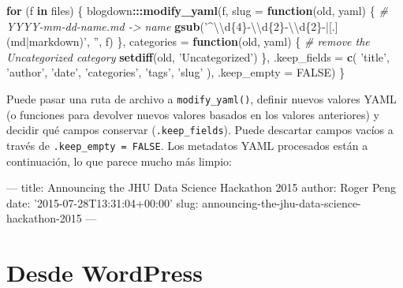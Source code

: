 \documentclass[12pt,]{krantz}
\makeatletter
\newenvironment{Shaded}{\begin{snugshade}}{\end{snugshade}}
\newcommand{\AttributeTok}[1]{\textcolor[rgb]{0.77,0.63,0.00}{#1}}
\newcommand{\CharTok}[1]{\textcolor[rgb]{0.31,0.60,0.02}{#1}}
\newcommand{\CommentTok}[1]{\textcolor[rgb]{0.56,0.35,0.01}{\textit{#1}}}
\newcommand{\ControlFlowTok}[1]{\textcolor[rgb]{0.13,0.29,0.53}{\textbf{#1}}}
\newcommand{\DataTypeTok}[1]{\textcolor[rgb]{0.13,0.29,0.53}{#1}}
\newcommand{\FunctionTok}[1]{\textcolor[rgb]{0.00,0.00,0.00}{#1}}
\newcommand{\KeywordTok}[1]{\textcolor[rgb]{0.13,0.29,0.53}{\textbf{#1}}}
\newcommand{\NormalTok}[1]{#1}
\newcommand{\OperatorTok}[1]{\textcolor[rgb]{0.81,0.36,0.00}{\textbf{#1}}}
\newcommand{\OtherTok}[1]{\textcolor[rgb]{0.56,0.35,0.01}{#1}}
\newcommand{\StringTok}[1]{\textcolor[rgb]{0.31,0.60,0.02}{#1}}
\newenvironment{kframe}{%
\medskip{}
\setlength{\fboxsep}{.8em}
 \def\at@end@of@kframe{}%
 \ifinner\ifhmode%
  \def\at@end@of@kframe{\end{minipage}}%
  \begin{minipage}{\columnwidth}%
 \fi\fi%
 \def\FrameCommand##1{\hskip\@totalleftmargin \hskip-\fboxsep
 \colorbox{shadecolor}{##1}\hskip-\fboxsep
     \hskip-\linewidth \hskip-\@totalleftmargin \hskip\columnwidth}%
 \MakeFramed {\advance\hsize-\width
   \@totalleftmargin\z@ \linewidth\hsize
   \@setminipage}}%
 {\par\unskip\endMakeFramed%
 \at@end@of@kframe}
\renewenvironment{Shaded}{\begin{kframe}}{\end{kframe}}
\theoremstyle{definition}
\theoremstyle{definition}
\theoremstyle{definition}
\theoremstyle{remark}
\makeatother
\begin{document}
\begin{Shaded}
\begin{Highlighting}[]
\ControlFlowTok{for}\NormalTok{ (f }\ControlFlowTok{in}\NormalTok{ files) \{}
\NormalTok{  blogdown}\OperatorTok{:::}\KeywordTok{modify_yaml}\NormalTok{(f, }\DataTypeTok{slug =} \ControlFlowTok{function}\NormalTok{(old, yaml) \{}
    \CommentTok{# YYYY-mm-dd-name.md -> name}
    \KeywordTok{gsub}\NormalTok{(}\StringTok{'^}\CharTok{\textbackslash{}\textbackslash{}}\StringTok{d\{4\}-}\CharTok{\textbackslash{}\textbackslash{}}\StringTok{d\{2\}-}\CharTok{\textbackslash{}\textbackslash{}}\StringTok{d\{2\}-|[.](md|markdown)'}\NormalTok{, }\StringTok{''}\NormalTok{, f)}
\NormalTok{  \}, }\DataTypeTok{categories =} \ControlFlowTok{function}\NormalTok{(old, yaml) \{}
    \CommentTok{# remove the Uncategorized category}
    \KeywordTok{setdiff}\NormalTok{(old, }\StringTok{'Uncategorized'}\NormalTok{)}
\NormalTok{  \}, }\DataTypeTok{.keep_fields =} \KeywordTok{c}\NormalTok{(}
    \StringTok{'title'}\NormalTok{, }\StringTok{'author'}\NormalTok{, }\StringTok{'date'}\NormalTok{, }\StringTok{'categories'}\NormalTok{, }\StringTok{'tags'}\NormalTok{, }\StringTok{'slug'}
\NormalTok{  ), }\DataTypeTok{.keep_empty =} \OtherTok{FALSE}\NormalTok{)}
\NormalTok{\}}
\end{Highlighting}
\end{Shaded}

Puede pasar una ruta de archivo a \texttt{modify\_yaml()}, definir
nuevos valores YAML (o funciones para devolver nuevos valores basados en
los valores anteriores) y decidir qué campos conservar
(\texttt{.keep\_fields}). Puede descartar campos vacíos a través de
\texttt{.keep\_empty\ =\ FALSE}. Los metadatos YAML procesados están a
continuación, lo que parece mucho más limpio:

\begin{Shaded}
\begin{Highlighting}[]
\OtherTok{---}
\FunctionTok{title:}\AttributeTok{ Announcing the JHU Data Science Hackathon 2015}
\FunctionTok{author:}\AttributeTok{ Roger Peng}
\FunctionTok{date:}\AttributeTok{ }\StringTok{'2015-07-28T13:31:04+00:00'}
\FunctionTok{slug:}\AttributeTok{ announcing-the-jhu-data-science-hackathon-2015}
\OtherTok{---}
\end{Highlighting}
\end{Shaded}

\hypertarget{desde-wordpress}{%
\section{Desde WordPress}\label{desde-wordpress}}
\end{document}
